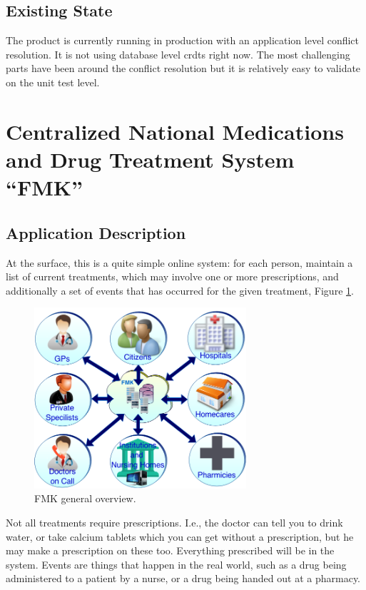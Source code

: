 \documentclass[11pt,a4paper]{report}
\begin{document}
\subsection{Existing State}
The product is currently running in production with an application level conflict resolution. It is not using database level \glspl{crdt} right now. The most challenging parts have been around the conflict resolution but it is relatively easy to validate on the unit test level.


\section{Centralized National Medications and Drug Treatment System ``FMK''}
\subsection{Application Description}
At the surface, this is a quite simple online system: for each person, maintain a list of current treatments, which may involve one or more prescriptions, and additionally a set of events that has occurred for the given treatment, Figure \ref{fig:medicalcard}. 
\begin{figure}[!h]
	\centering
	\includegraphics[width=0.7\textwidth]{./img/medicalcard.png}

	\caption{FMK general overview.}
	\label{fig:medicalcard}
\end{figure}

Not all treatments require prescriptions. I.e., the doctor can tell you to drink water, or take calcium tablets which you can get without a prescription, but he may make a prescription on these too. Everything prescribed will be in the system. Events are things that happen in the real world, such as a drug being administered to a patient by a nurse, or a drug being handed out at a pharmacy. 
\end{document}
